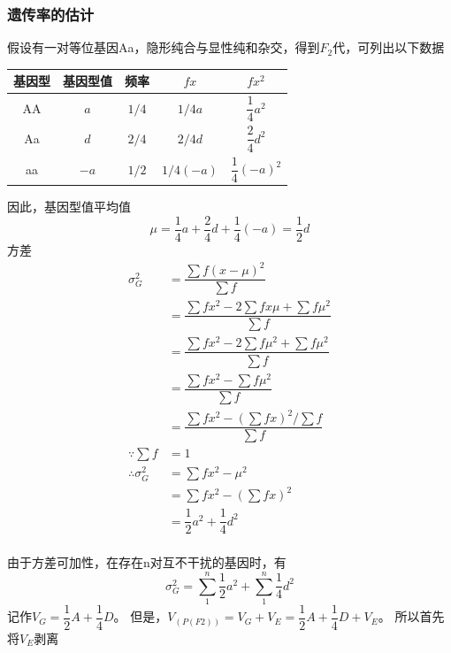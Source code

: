 \documentclass[a4paper, 12pt]{report}
\begin{document}
\subsubsection{遗传率的估计}
假设有一对等位基因Aa，隐形纯合与显性纯和杂交，得到\(F_2\)代，可列出以下数据
\begin{center}
    \begin{tabular}{ccccc}
        基因型 & 基因型值   & 频率      & \(fx\)      & \(fx^2\)               \\
        \hline
        AA  & \(a\)  & \(1/4\) & \(1/4a\)    & \(\dfrac{1}{4}a^2\)    \\
        Aa  & \(d\)  & \(2/4\) & \(2/4d\)    & \(\dfrac{2}{4}d^2\)    \\
        aa  & \(-a\) & \(1/2\) & \(1/4(-a)\) & \(\dfrac{1}{4}(-a)^2\) \\
    \end{tabular}
\end{center}
因此，基因型值平均值\[\mu=\dfrac{1}{4}a+\dfrac{2}{4}d+\dfrac{1}{4}(-a)=\dfrac{1}{2}d\]
方差
\[
    \begin{aligned}
        \sigma_G^2            & =\dfrac{\sum f(x-\mu)^2}{\sum f}                    \\
                              & =\dfrac{\sum fx^2-2\sum fx\mu+\sum f\mu^2}{\sum f}  \\
                              & =\dfrac{\sum fx^2-2\sum f\mu^2+\sum f\mu^2}{\sum f} \\
                              & =\dfrac{\sum fx^2-\sum f\mu^2}{\sum f}              \\
                              & =\dfrac{\sum fx^2-(\sum fx)^2/\sum f}{\sum f}       \\
        \because \sum f       & =1                                                  \\
        \therefore \sigma_G^2 & =\sum fx^2-\mu^2                                    \\
                              & =\sum fx^2-(\sum fx)^2                              \\
                              & =\dfrac12a^2+\dfrac14d^2                            \\
    \end{aligned}
\]

由于方差可加性，在存在n对互不干扰的基因时，有\[\sigma_G^2=\sum_{1}^{n}\dfrac{1}{2}a^2+\sum_{1}^{n}\dfrac{1}{4}d^2\]
记作\(V_G=\dfrac{1}{2}A+\dfrac{1}{4}D\)。
但是，\(V_{(P(F2))}=V_G+V_E=\dfrac{1}{2}A+\dfrac{1}{4}D+V_E\)。
所以首先将\(V_E\)剥离
\end{document}
